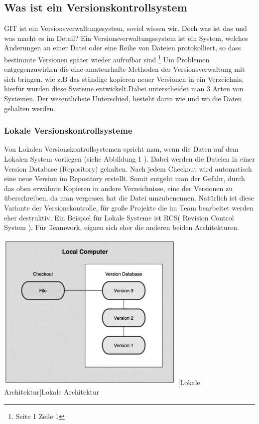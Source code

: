 \documentclass[12pt,a4paper,bibliography=totocnumbered,listof=totocnumbered]{scrartcl}
\begin{document}
\subsection{Was ist ein Versionskontrollsystem}
GIT ist ein Versionsverwaltungssystem, soviel wissen wir. Doch was ist das und was macht es im Detail? Ein Versionsverwaltungssystem ist ein System, welches Änderungen an einer Datei oder eine Reihe von Dateien protokolliert, so dass  bestimmte Versionen später wieder aufrufbar sind.\footnote{\cite{chacon2009pro} Seite 1 Zeile 1 } Um Problemen entgegenzuwirken die eine amateurhafte Methoden der Versionsverwaltung mit sich bringen, wie z.B das ständige kopieren neuer Versionen in ein Verzeichnis, hierfür wurden diese Systeme entwickelt.Dabei unterscheidet man 3 Arten von Systemen. Der wesentlichste Unterschied, besteht darin wie und wo die Daten gehalten werden.

\subsubsection{Lokale Versionskontrollsysteme}
Von Lokalen Versionskontrollsystemen spricht man, wenn die Daten auf dem Lokalen System vorliegen (siehe Abbildung 1 ). Dabei werden die Dateien in einer Version Database (Repository) gehalten. Nach jedem Checkout wird automatisch eine neue Version im Repository erstellt. Somit entgeht man der Gefahr, durch das oben erwähnte Kopieren in andere Verzeichnisse, eine der Versionen zu überschreiben, da man vergessen hat die Datei umzubenennen. Natürlich ist diese Variante der Versionskontrolle, für große Projekte die im Team bearbeitet werden eher destruktiv. Ein Beispiel für Lokale Systeme ist RCS( Revision Control System ). Für Teamwork, eignen sich eher die anderen beiden Architekturen. 

\vspace{3pt}
\begin{minipage}{\linewidth}
	\centering
	\includegraphics[width=0.4\linewidth]{Bilder/LVKS.png}
	[Lokale Architektur]{Lokale Architektur  \cite{chacon2009pro}\footnotemark }
	\label{fig:osgi}
\end{minipage}
\newpage
\end{document}
